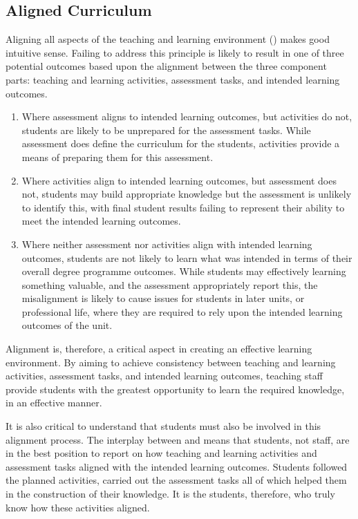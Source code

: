 
\subsection{Aligned Curriculum} %
\label{sub:disc_aligned_curriculum}

Aligning all aspects of the teaching and learning environment () makes good intuitive sense. Failing to address this principle is likely to result in one of three potential outcomes based upon the alignment between the three component parts: teaching and learning activities, assessment tasks, and intended learning outcomes.

\begin{enumerate}
	\item Where assessment aligns to intended learning outcomes, but activities do not, students are likely to be unprepared for the assessment tasks. While assessment does define the curriculum for the students, activities provide a means of preparing them for this assessment. 
	\item Where activities align to intended learning outcomes, but assessment does not, students may build appropriate knowledge but the assessment is unlikely to identify this, with final student results failing to represent their ability to meet the intended learning outcomes. 
	\item Where neither assessment nor activities align with intended learning outcomes, students are not likely to learn what was intended in terms of their overall degree programme outcomes. While students may effectively learning something valuable, and the assessment appropriately report this, the misalignment is likely to cause issues for students in later units, or professional life, where they are required to rely upon the intended learning outcomes of the unit.
\end{enumerate}

Alignment is, therefore, a critical aspect in creating an effective learning environment. By aiming to achieve consistency between teaching and learning activities, assessment tasks, and intended learning outcomes, teaching staff provide students with the greatest opportunity to learn the required knowledge, in an effective manner. 

It is also critical to understand that students must also be involved in this alignment process. The interplay between  and  means that students, not staff, are in the best position to report on how teaching and learning activities and assessment tasks aligned with the intended learning outcomes. Students followed the planned activities, carried out the assessment tasks all of which helped them in the construction of their knowledge. It is the students, therefore, who truly know how these activities aligned.

